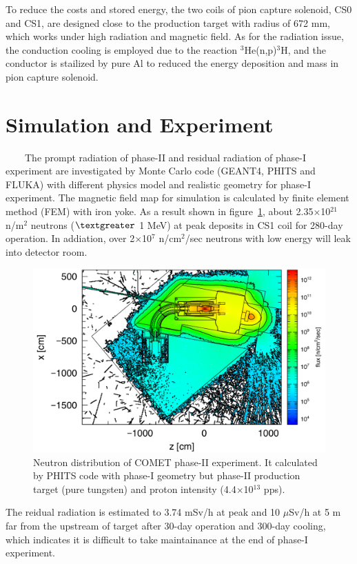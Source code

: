 \documentclass[a4paper, 10pt, twocolumn]{article}
\begin{document}
To reduce the costs and stored energy, the two coils of pion capture solenoid, CS0 and CS1, are designed close to the production target with radius of 672 mm, which works under high radiation and magnetic field.
As for the radiation issue, the conduction cooling is employed due to the reaction $^3$He(n,p)$^3$H, and the conductor is stailized by pure Al to reduced the energy deposition and mass in pion capture solenoid.

\section{Simulation and Experiment}
~~~~The prompt radiation of phase-II and residual radiation of phase-I experiment are investigated by Monte Carlo code (GEANT4\cite{geant}, PHITS\cite{phits} and FLUKA\cite{fluka}) with different physics model and realistic geometry for phase-I experiment.
The magnetic field map for simulation is calculated by finite element method (FEM) with iron yoke.
As a result shown in figure~\ref{geo}, about 2.35$\times$10$^{21}$ n/m$^2$ neutrons ($\textgreater$ 1 MeV) at peak deposits in CS1 coil for 280-day operation.
In addiation, over 2$\times$10$^7$ n/cm$^2$/sec neutrons with low energy will leak into detector room.
\begin{figure}[H]
 \centering
 \includegraphics[scale=0.3]{fig/neutron.pdf}
 \caption{Neutron distribution of COMET phase-II experiment. It calculated by PHITS code with phase-I geometry but phase-II production target (pure tungsten) and proton intensity (4.4$\times$10$^{13}$ pps).}
 \label{geo}
\end{figure}
The reidual radiation is estimated to 3.74 mSv/h at peak and 10 $\mu$Sv/h at 5 m far from the upstream of target after 30-day operation and 300-day cooling, which indicates it is difficult to take maintainance at the end of phase-I experiment.
\end{document}
